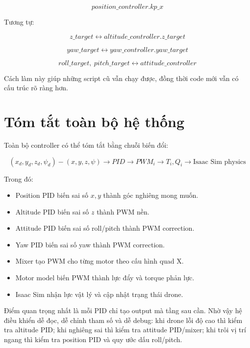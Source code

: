 \begin{equation}
    position\_controller.kp\_x
\end{equation}

Tương tự:

\begin{equation}
    z\_target
    \leftrightarrow
    altitude\_controller.z\_target
\end{equation}

\begin{equation}
    yaw\_target
    \leftrightarrow
    yaw\_controller.yaw\_target
\end{equation}

\begin{equation}
    roll\_target,\ pitch\_target
    \leftrightarrow
    attitude\_controller
\end{equation}

Cách làm này giúp những script cũ vẫn chạy được, đồng thời code mới vẫn có cấu
trúc rõ ràng hơn.

\section{Tóm tắt toàn bộ hệ thống}

Toàn bộ controller có thể tóm tắt bằng chuỗi biến đổi:

\begin{equation}
    (x_d,y_d,z_d,\psi_d)
    -
    (x,y,z,\psi)
    \longrightarrow
    PID
    \longrightarrow
    PWM_i
    \longrightarrow
    T_i,Q_i
    \longrightarrow
    \text{Isaac Sim physics}
\end{equation}

Trong đó:

\begin{itemize}
    \item Position PID biến sai số $x,y$ thành góc nghiêng mong muốn.
    \item Altitude PID biến sai số $z$ thành PWM nền.
    \item Attitude PID biến sai số roll/pitch thành PWM correction.
    \item Yaw PID biến sai số yaw thành PWM correction.
    \item Mixer tạo PWM cho từng motor theo cấu hình quad X.
    \item Motor model biến PWM thành lực đẩy và torque phản lực.
    \item Isaac Sim nhận lực vật lý và cập nhật trạng thái drone.
\end{itemize}

Điểm quan trọng nhất là mỗi PID chỉ tạo output mà tầng sau cần. Nhờ vậy hệ điều
khiển dễ đọc, dễ chỉnh tham số và dễ debug: khi drone lỗi độ cao thì kiểm tra
altitude PID; khi nghiêng sai thì kiểm tra attitude PID/mixer; khi trôi vị trí
ngang thì kiểm tra position PID và quy ước dấu roll/pitch.
